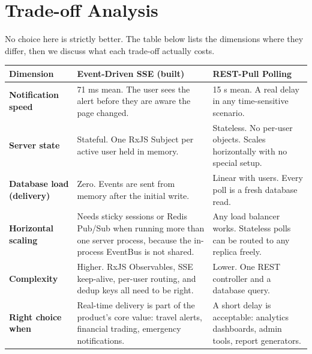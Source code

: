 \documentclass[12pt,a4paper]{article}
\begin{document}
\section{Trade-off Analysis}

No choice here is strictly better. The table below lists the dimensions where they differ, then
we discuss what each trade-off actually costs.

\begin{longtable}{@{}L{2.8cm}L{5.6cm}L{5.6cm}@{}}
\toprule
\textbf{Dimension} & \textbf{Event-Driven SSE (built)} & \textbf{REST-Pull Polling} \\
\midrule
\endhead

\textbf{Notification speed} &
  \textcolor{successgreen}{71 ms mean.} The user sees the alert before they are aware the
  page changed. &
  \textcolor{warningorange}{15 s mean.} A real delay in any time-sensitive scenario. \\[0.5em]

\textbf{Server state} &
  \textcolor{warningorange}{Stateful.} One RxJS Subject per active user held in memory. &
  \textcolor{successgreen}{Stateless.} No per-user objects. Scales horizontally with no
  special setup. \\[0.5em]

\textbf{Database load (delivery)} &
  \textcolor{successgreen}{Zero.} Events are sent from memory after the initial write. &
  \textcolor{warningorange}{Linear with users.} Every poll is a fresh database read. \\[0.5em]

\textbf{Horizontal scaling} &
  \textcolor{warningorange}{Needs sticky sessions or Redis Pub/Sub} when running more than
  one server process, because the in-process EventBus is not shared. &
  \textcolor{successgreen}{Any load balancer works.} Stateless polls can be routed to any
  replica freely. \\[0.5em]

\textbf{Complexity} &
  \textcolor{warningorange}{Higher.} RxJS Observables, SSE keep-alive, per-user routing, and
  dedup keys all need to be right. &
  \textcolor{successgreen}{Lower.} One REST controller and a database query. \\[0.5em]

\textbf{Right choice when} &
  Real-time delivery is part of the product's core value: travel alerts, financial trading,
  emergency notifications. &
  A short delay is acceptable: analytics dashboards, admin tools, report generators. \\

\bottomrule
\end{longtable}
\end{document}
